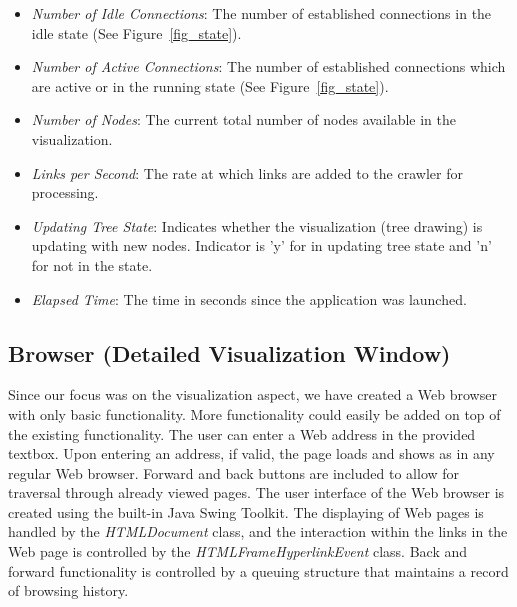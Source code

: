 \documentclass[10pt,psfig]{article}
\begin{document}
{\begin{itemize}
\item {\em Number of Idle Connections}: The number of established connections in the idle state (See Figure~\ref{fig_state}).

\item {\em Number of Active Connections}: The number of established connections which are active or in the running state (See Figure~\ref{fig_state}).

\item {\em Number of Nodes}: The current total number of nodes available in the visualization.

\item {\em Links per Second}: The rate at which links are added to the crawler for processing.

\item {\em Updating Tree State}: Indicates whether the visualization (tree drawing) is updating with new nodes.  Indicator is 'y' for in updating tree state and 'n' for not in the state.

\item {\em Elapsed Time}: The time in seconds since the application was launched.

\end{itemize}

\subsection{Browser (Detailed Visualization Window)}
\label{ss:browser}

Since our focus was on the visualization aspect, we have created a Web browser with only basic functionality.  
More functionality could easily be added on top of the existing functionality.
The user can enter a Web address in the provided textbox.  Upon entering an address, if valid, the page loads and shows as in any regular Web browser.
Forward and back buttons are included to allow for traversal through already viewed pages.  
The user interface of the Web browser is created using the built-in Java Swing Toolkit.
The displaying of Web pages is handled by the {\em HTMLDocument} class, and the interaction within the links in the Web page is controlled by the {\em HTMLFrameHyperlinkEvent} class.
Back and forward functionality is controlled by a queuing structure that maintains a record of browsing history.


}
\end{document}
